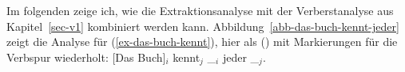 Im folgenden zeige ich, wie die Extraktionsanalyse
mit der Verberstanalyse aus Kapitel~\ref{sec-v1} kombiniert werden kann.
Abbildung~\vref{abb-das-buch-kennt-jeder} zeigt die Analyse für (\ref{ex-das-buch-kennt}),
hier als () mit Markierungen für die Verbspur wiederholt:
\ea
{}[Das Buch]$_i$ kennt$_j$  \_$_i$ jeder \_$_j$.
\z
\begin{figure}

\end{figure}

